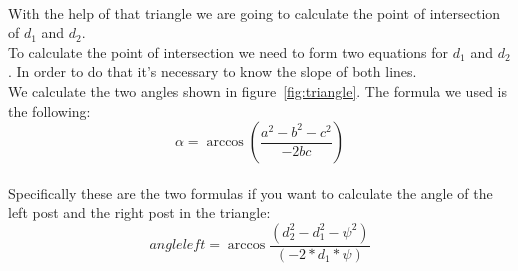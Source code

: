 \documentclass[lnicst,a4paper]{svmultln}
\begin{document}
\\
With the help of that triangle we are going to calculate the point of intersection of \(d_{1}\) and \(d_{2}\). 
\\ 
To calculate the point of intersection we need to form two equations for \(d_{1}\) and \(d_{2}\). In order to do that it's necessary to know the slope of both lines. 
\\
We calculate the two angles shown in figure~\ref{fig:triangle}.
The formula we used is the following:
\begin{equation}
	\alpha = \arccos{(\frac{a^2-b^2-c^2}{-2bc})}
	\label{equ:angle1}
\end{equation}
\\
Specifically these are the two formulas if you want to calculate the angle of the left post and the right post in the triangle:
\\
\begin{equation}
	angleleft = \arccos{\frac{(d_{2}^2 - d_{1}^2 - \psi^2)}{(-2*d_{1}*\psi)}}
	\label{equ:angleleft}
\end{equation}
\end{document}
